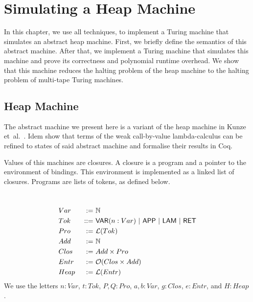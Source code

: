 \chapter{Simulating a Heap Machine}
\label{chap:heap}

In this chapter, we use all techniques, to implement a Turing machine that simulates an abstract heap machine.  First, we briefly define the semantics
of this abstract machine.  After that, we implement a Turing machine that simulates this machine and prove its correctness and polynomial runtime
overhead.  We show that this machine reduces the halting problem of the heap machine to the halting problem of multi-tape Turing machines.

\section{Heap Machine}
\label{sec:heap-def}

The abstract machine we present here is a variant of the heap machine in Kunze et~al.~\cite{KunzeEtAl:2018:Formal}.  Idem show that terms of the weak
call-by-value lambda-calculus can be refined to states of said abstract machine and formalise their results in Coq.

Values of this machines are closures.  A closure is a program and a pointer to the environment of bindings.  This environment is implemented as a
linked list of closures.  Programs are lists of tokens, as defined below.
\begin{definition}
  \label{def:Heap}
  ~
  \begin{alignat*}{2}
    &Var  &~:=~& \mathbb{N} \\
    &Tok  &~::=~& \mathsf{VAR}(n:Var) ~|~ \mathsf{APP} ~|~ \mathsf{LAM} ~|~ \mathsf{RET} \\
    &Pro  &~:=~& \mathcal{L}(Tok) \\
    &Add  &~:=~& \mathbb{N} \\
    &Clos &~:=~& Add \times Pro \\
    &Entr &~:=~& \mathcal{O}(Clos \times Add) \\
    &Heap &~:=~& \mathcal{L}(Entr)
  \end{alignat*}
  We use the letters $n:Var$, $t:Tok$, $P,Q:Pro$, $a,b:Var$, $g:Clos$, $e:Entr$, and $H:Heap$.
\end{definition}

